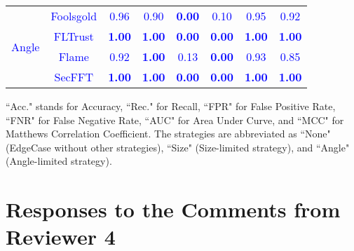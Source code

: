 \documentclass[a4paper,twoside,11pt,dvipsnames]{reviewresponse}
\begin{document}
\begin{table}[h!]
{\begin{tabular}{c|c|c|c|c|c|c|c}
\multirow{4}{*}{\textcolor{blue}{Angle}} & \textcolor{blue}{Foolsgold} & \textcolor{blue}{0.96} & \textcolor{blue}{0.90} & \textbf{\textcolor{blue}{0.00}} & \textcolor{blue}{0.10} & \textcolor{blue}{0.95} & \textcolor{blue}{0.92} \\ 
                        & \textcolor{blue}{FLTrust}   & \textbf{\textcolor{blue}{1.00}} & \textbf{\textcolor{blue}{1.00}} & \textbf{\textcolor{blue}{0.00}} & \textbf{\textcolor{blue}{0.00}} & \textbf{\textcolor{blue}{1.00}} & \textbf{\textcolor{blue}{1.00}} \\ 
                        & \textcolor{blue}{Flame}     & \textcolor{blue}{0.92} & \textbf{\textcolor{blue}{1.00}} & \textcolor{blue}{0.13} & \textbf{\textcolor{blue}{0.00}} & \textcolor{blue}{0.93} & \textcolor{blue}{0.85} \\ 
                        & \textcolor{blue}{SecFFT}    & \textbf{\textcolor{blue}{1.00}} & \textbf{\textcolor{blue}{1.00}} & \textbf{\textcolor{blue}{0.00}} & \textbf{\textcolor{blue}{0.00}} & \textbf{\textcolor{blue}{1.00}} & \textbf{\textcolor{blue}{1.00}} \\ \hline

\end{tabular}
}
\vspace{1em}
\begin{tablenotes}
\scriptsize
\item ``Acc." stands for Accuracy, ``Rec." for Recall, ``FPR" for False Positive Rate, ``FNR" for False Negative Rate, ``AUC" for Area Under Curve, and ``MCC" for Matthews Correlation Coefficient. The strategies are abbreviated as ``None" (EdgeCase without other strategies), ``Size" (Size-limited strategy), and ``Angle" (Angle-limited strategy).
\end{tablenotes}
\label{tab:detect}
\end{table}

\newpage

\section{Responses to the Comments from Reviewer 4}
\end{document}
